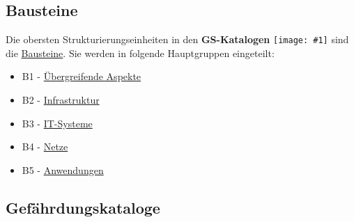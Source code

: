 \documentclass[a4paper,10pt]{book}
\newcommand{\icon}[1]{\texttt{[image: \#1]}}
\begin{document}
\subsection{Bausteine}
Die obersten Strukturierungseinheiten in den \textbf{GS-Katalogen} \icon{Icon/GS_Kataloge.png} sind die \href{https://www.bsi.bund.de/cln_156/DE/Themen/weitereThemen/ITGrundschutzKataloge/Inhalt/Bausteine/bausteine_node.html}{Bausteine}. Sie werden in folgende Hauptgruppen eingeteilt:
\begin{itemize}
\item B1 -
  \href{https://www.bsi.bund.de/cln_156/DE/Themen/weitereThemen/ITGrundschutzKataloge/Inhalt/Bausteine/B1uebergeordneteAspekte/b1uebergeordneteaspekte_node.html}{Übergreifende
    Aspekte}
\item B2 - \href{https://www.bsi.bund.de/cln_156/DE/Themen/weitereThemen/ITGrundschutzKataloge/Inhalt/Bausteine/B2Infrastruktur/b2infrastruktur_node.html}{Infrastruktur}
\item B3 - \href{https://www.bsi.bund.de/cln_156/DE/Themen/weitereThemen/ITGrundschutzKataloge/Inhalt/Bausteine/B3ITSysteme/b3itsysteme_node.html}{IT-Systeme}
\item B4 - \href{https://www.bsi.bund.de/cln_156/DE/Themen/weitereThemen/ITGrundschutzKataloge/Inhalt/Bausteine/B4Netze/b4netze_node.html}{Netze}
\item B5 - \href{https://www.bsi.bund.de/cln_156/DE/Themen/weitereThemen/ITGrundschutzKataloge/Inhalt/Bausteine/B5Anwendungen/b5anwendungen_node.html}{Anwendungen}
\end{itemize}
\subsection{Gefährdungskataloge}
\end{document}
